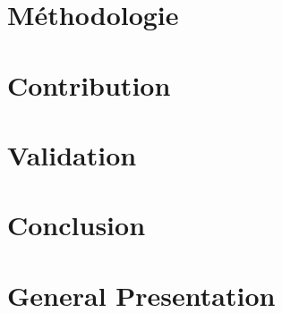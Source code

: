 \documentclass[11pt,xcolor=dvipsnames,presentation]{beamer}
\begin{document}
\section{Méthodologie}
\label{sec-5}
\section{Contribution}
\label{sec-6}
\section{Validation}
\label{sec-7}
\section{Conclusion}
\label{sec-8}


\section{General Presentation}
\label{sec-9}
\end{document}

